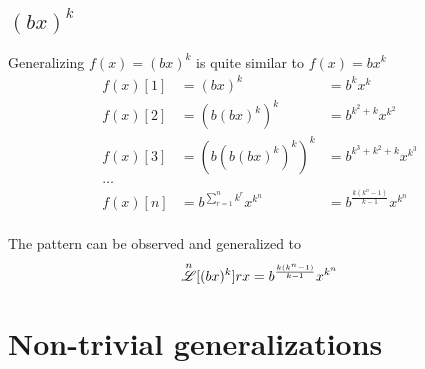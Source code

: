 \documentclass[12pt, letterpaper]{article}
\begin{document}
\subsection{$(bx)^k$}
Generalizing {$f(x) = (bx)^{k}$} is quite similar to {$f(x) = bx^k$}
\begin{align*}
    f(x)[1] &= (bx)^{k}             &= b^{k}x^{k} \\
    f(x)[2] &= (b(bx)^{k})^{k}       &= b^{k^{2}+k}x^{k^{2}} \\
    f(x)[3] &= (b(b(bx)^{k})^{k})^{k} &= b^{k^{3} + k^{2} + k} x^{k^{3}} \\
       \dots \\
    f(x)[n] &= b^{\sum_{r=1}^{n} k^{r}} x^{k^{n}}  &= b^{\frac{k(k^{n}-1)}{k-1}}x^{k^{n}}
\end{align*}
\\The pattern can be observed and generalized to
$$\overset{n}{\mathscr{L}} [(bx)^k] rx = b^{\frac{k(k^{n}-1)}{k-1}}x^{k^{n}}$$

\newpage
\section{Non-trivial generalizations}
\end{document}
